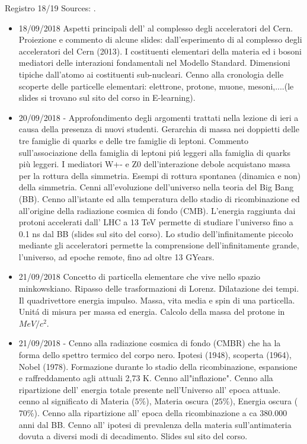 \begin{frame}[allowframebreaks]{Registro 18/19}
Sources: \cite{reg18}.

\listofkeywords

\begin{itemize}
\item 18/09/2018 Aspetti principali dell' al complesso degli acceleratori del Cern. Proiezione e commento di alcune slides: dall'esperimento di  al complesso degli acceleratori del Cern (2013). I costituenti elementari della materia ed i bosoni mediatori delle interazioni fondamentali nel Modello Standard. Dimensioni tipiche dall'atomo ai costituenti sub-nucleari. Cenno alla cronologia delle scoperte delle particelle elementari: elettrone, protone, muone, mesoni,....(le slides si trovano sul sito del corso in E-learning).
\item 20/09/2018 - Approfondimento degli argomenti trattati nella lezione di ieri a causa della presenza di nuovi studenti. Gerarchia di massa nei doppietti delle tre famiglie di quarks e delle tre famiglie di leptoni. Commento sull'associazione della famiglia di leptoni pi\'u leggeri alla famiglia di quarks più leggeri. I mediatori W+- e Z0 dell'interazione debole acquistano massa per la rottura della simmetria. Esempi di rottura spontanea (dinamica e non) della simmetria. Cenni all'evoluzione dell'universo nella teoria del Big Bang (BB). Cenno all'istante ed alla temperatura dello stadio di ricombinazione ed all'origine della radiazione cosmica di fondo (CMB). L'energia raggiunta dai protoni accelerati dall' LHC a 13 TeV permette di studiare l'universo fino a 0.1 ns dal BB (slides sul sito del corso). Lo studio dell'infinitamente piccolo mediante gli acceleratori permette la comprensione dell'infinitamente grande, l'universo, ad epoche remote, fino ad oltre 13 GYears.
\item 21/09/2018 Concetto di particella elementare che vive nello spazio minkowskiano. Ripasso delle trasformazioni di Lorenz. Dilatazione dei tempi. Il quadrivettore energia impulso. Massa, vita media e spin di una particella. Unit\'a di misura per massa ed energia. Calcolo della massa del protone in $MeV/c^2$.
\item 21/09/2018 - Cenno alla radiazione cosmica di fondo (CMBR) che ha la forma dello spettro termico del corpo nero. Ipotesi (1948), scoperta (1964), Nobel (1978). Formazione durante lo stadio della ricombinazione, espansione e raffreddamento agli attuali 2,73 K. Cenno all"inflazione". Cenno alla ripartizione dell' energia totale presente nell'Universo all' epoca attuale. cenno al significato di Materia ($5\%$), Materia oscura ($25\%$), Energia oscura ($70\%$). Cenno alla ripartizione all' epoca della ricombinazione a ca 380.000 anni dal BB. Cenno all' ipotesi di prevalenza della materia sull'antimateria dovuta a diversi modi di decadimento. Slides sul sito del corso.

\end{itemize}
\end{frame}
